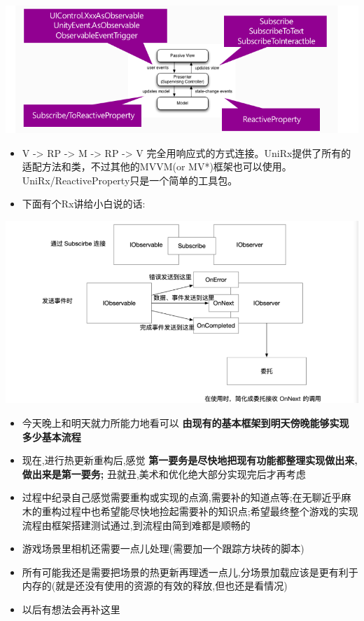 \documentclass[9pt, b5paper]{article}
\begin{document}
\includegraphics[width=.9\linewidth]{./pic/readme_20221012_085957.png}
\begin{itemize}
\item V -> RP -> M -> RP -> V 完全用响应式的方式连接。UniRx提供了所有的适配方法和类，不过其他的MVVM(or MV*)框架也可以使用。UniRx/ReactiveProperty只是一个简单的工具包。
\item 下面有个Rx讲给小白说的话:
\end{itemize}

\includegraphics[width=.9\linewidth]{./pic/readme_20221012_095227.png}
\begin{itemize}
\item 今天晚上和明天就力所能力地看可以 \textbf{由现有的基本框架到明天傍晚能够实现多少基本流程}
\item 现在,进行热更新重构后,感觉 \textbf{第一要务是尽快地把现有功能都整理实现做出来,做出来是第一要务;} 丑就丑,美术和优化绝大部分实现完后才再考虑
\item 过程中纪录自己感觉需要重构或实现的点滴,需要补的知道点等;在无聊近乎麻木的重构过程中也希望能尽快地捡起需要补的知识点;希望最终整个游戏的实现流程由框架搭建测试通过,到流程由简到难都是顺畅的
\item 游戏场景里相机还需要一点儿处理(需要加一个跟踪方块砖的脚本)
\item 所有可能我还是需要把场景的热更新再理透一点儿,分场景加载应该是更有利于内存的(就是还没有使用的资源的有效的释放,但也还是看情况)

\item 以后有想法会再补这里
\end{itemize}
\end{document}
